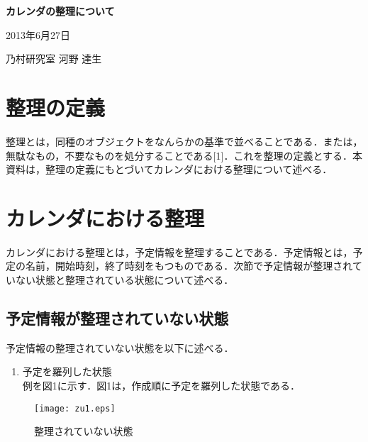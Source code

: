 \documentclass[fleqn, 14pt]{extarticlej}
\begin{document}
\begin{center}
{\Large {\bf カレンダの整理について}}
\end{center}

\begin{flushright}
2013年6月27日

乃村研究室 河野 達生
\end{flushright}

\section{整理の定義}
整理とは，同種のオブジェクトをなんらかの基準で並べることである．または，無駄なもの，不要なものを処分することである[1]．これを整理の定義とする．本資料は，整理の定義にもとづいてカレンダにおける整理について述べる．

\section{カレンダにおける整理}
カレンダにおける整理とは，予定情報を整理することである．予定情報とは，予定の名前，開始時刻，終了時刻をもつものである．次節で予定情報が整理されていない状態と整理されている状態について述べる．

\subsection{予定情報が整理されていない状態}
予定情報の整理されていない状態を以下に述べる．
\begin{enumerate}
	\item 予定を羅列した状態\\
	例を図1に示す．図1は，作成順に予定を羅列した状態である．
\end{enumerate}	

\begin{figure}
  \begin{center}
    \texttt{[image: zu1.eps]}
    \caption{整理されていない状態}
  \end{center}
\end{figure}
\end{document}
